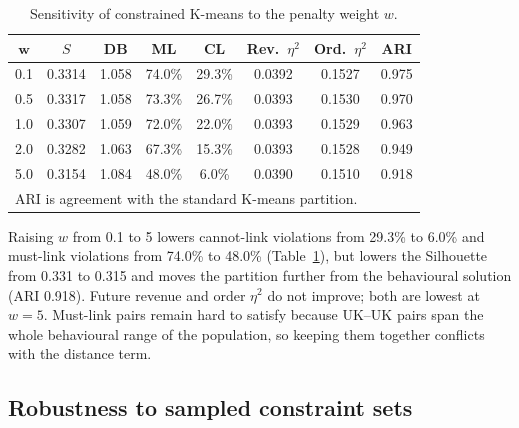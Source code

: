 \documentclass[conference,10pt]{IEEEtran}
\newcommand{\etasq}{\eta^{2}}
\begin{document}
\begin{table}[t]
\centering
\caption{Sensitivity of constrained K-means to the penalty weight $w$.}
\label{tab:weights}
\footnotesize
\setlength{\tabcolsep}{2.6pt}
\begin{tabular}{cccccccc}
\toprule
$\boldsymbol{w}$ & \textbf{$S$} & \textbf{DB} & \textbf{ML} & \textbf{CL} &
\textbf{Rev.\ $\etasq$} & \textbf{Ord.\ $\etasq$} & \textbf{ARI}\\
\midrule
0.1 & 0.3314 & 1.058 & 74.0\% & 29.3\% & 0.0392 & 0.1527 & 0.975\\
0.5 & 0.3317 & 1.058 & 73.3\% & 26.7\% & 0.0393 & 0.1530 & 0.970\\
1.0 & 0.3307 & 1.059 & 72.0\% & 22.0\% & 0.0393 & 0.1529 & 0.963\\
2.0 & 0.3282 & 1.063 & 67.3\% & 15.3\% & 0.0393 & 0.1528 & 0.949\\
5.0 & 0.3154 & 1.084 & 48.0\% &  6.0\% & 0.0390 & 0.1510 & 0.918\\
\bottomrule
\multicolumn{8}{l}{\scriptsize ARI is agreement with the standard K-means partition.}
\end{tabular}
\end{table}


Raising $w$ from 0.1 to 5 lowers cannot-link violations from 29.3\% to 6.0\%
and must-link violations from 74.0\% to 48.0\% (Table~\ref{tab:weights}), but lowers the Silhouette from 0.331 to 0.315 and
moves the partition further from the behavioural solution (ARI 0.918).
Future revenue and order $\etasq$ do not improve; both are lowest at $w=5$.
Must-link pairs remain hard to satisfy because UK--UK pairs span the whole
behavioural range of the population, so keeping them together conflicts with
the distance term.

\subsection{Robustness to sampled constraint sets}
\end{document}
